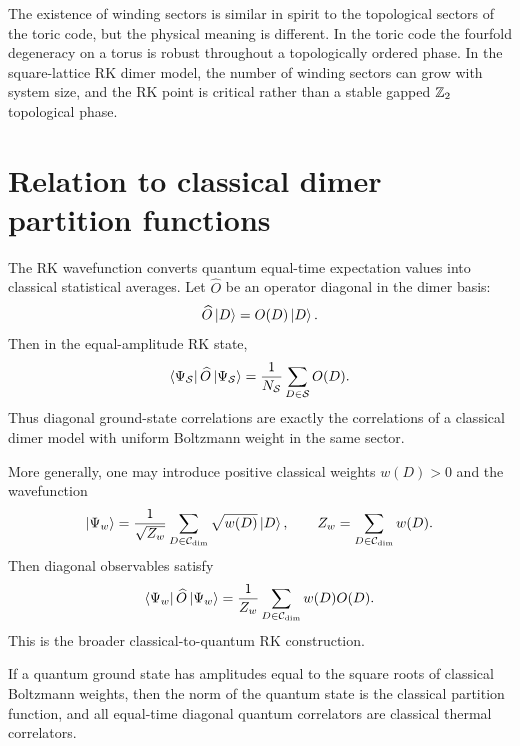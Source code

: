 The existence of winding sectors is similar in spirit to the topological sectors
of the toric code, but the physical meaning is different.  In the toric code the
fourfold degeneracy on a torus is robust throughout a topologically ordered
phase.  In the square-lattice RK dimer model, the number of winding sectors can
grow with system size, and the RK point is critical rather than a stable gapped
\(\mathbb{Z}_2\) topological phase.

\section{Relation to classical dimer partition functions}
\label{sec:rk-classical-dimer-correspondence}

The RK wavefunction converts quantum equal-time expectation values into
classical statistical averages.  Let \(\widehat{O}\) be an operator diagonal in
the dimer basis:
\begin{equation}
\label{eq:diagonal-dimer-operator}
    \widehat{O}\left|D\right\rangle=O(D)\left|D\right\rangle .
\end{equation}
Then in the equal-amplitude RK state,
\begin{equation}
\label{eq:rk-diagonal-observable-classical-average}
    \left\langle \Psi_{\mathcal{S}}\right|\widehat{O}\left|\Psi_{\mathcal{S}}\right\rangle
    =
    \frac{1}{N_{\mathcal{S}}}
    \sum_{D\in\mathcal{S}}O(D).
\end{equation}
Thus diagonal ground-state correlations are exactly the correlations of a
classical dimer model with uniform Boltzmann weight in the same sector.

More generally, one may introduce positive classical weights \(w(D)>0\) and the
wavefunction
\begin{equation}
\label{eq:weighted-rk-wavefunction}
    \left|\Psi_w\right\rangle
    =
    \frac{1}{\sqrt{Z_w}}
    \sum_{D\in\mathcal{C}_{\rm dim}}
    \sqrt{w(D)}\left|D\right\rangle,
    \qquad
    Z_w=
    \sum_{D\in\mathcal{C}_{\rm dim}}w(D).
\end{equation}
Then diagonal observables satisfy
\begin{equation}
\label{eq:weighted-rk-classical-average}
    \left\langle \Psi_w\right|\widehat{O}\left|\Psi_w\right\rangle
    =
    \frac{1}{Z_w}
    \sum_{D\in\mathcal{C}_{\rm dim}}w(D)O(D).
\end{equation}
This is the broader classical-to-quantum RK construction.

\begin{principle}
If a quantum ground state has amplitudes equal to the square roots of classical
Boltzmann weights, then the norm of the quantum state is the classical partition
function, and all equal-time diagonal quantum correlators are classical thermal
correlators.
\end{principle}

